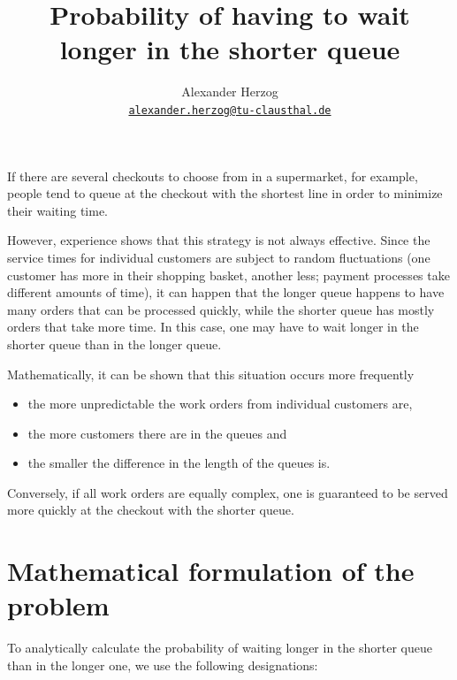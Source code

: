 \documentclass[a4paper,11pt,oneside]{article}
\begin{document}
\title{Probability of having to wait longer in the shorter queue}
\author{Alexander Herzog\\\href{mailto:alexander.herzog@tu-clausthal.de}{\small\texttt{alexander.herzog@tu-clausthal.de}}}
\date{}

\maketitle

If there are several checkouts to choose from in a supermarket, for example, people tend to queue at the checkout with the shortest line in order to minimize their waiting time.

However, experience shows that this strategy is not always effective. Since the service times for individual customers are subject to random fluctuations (one customer has more in their shopping basket, another less; payment processes take different amounts of time), it can happen that the longer queue happens to have many orders that can be processed quickly, while the shorter queue has mostly orders that take more time. In this case, one may have to wait longer in the shorter queue than in the longer queue.

Mathematically, it can be shown that this situation occurs more frequently
\begin{itemize}
\item the more unpredictable the work orders from individual customers are,
\item the more customers there are in the queues and
\item the smaller the difference in the length of the queues is.
\end{itemize}

Conversely, if all work orders are equally complex, one is guaranteed to be served more quickly at the checkout with the shorter queue.



\section{Mathematical formulation of the problem}

To analytically calculate the probability of waiting longer in the shorter queue than in the longer one, we use the following designations:
\end{document}
